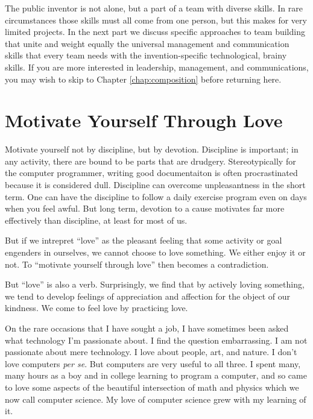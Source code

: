 \documentclass[
	fontsize=10pt, %
	twoside=false, %
	secnumdepth=1, %
]{kaobook}
\begin{document}

The public inventor is not alone, but a part of a team with diverse skills.
In rare circumstances those skills must all come from one person, but
this makes for very limited projects.
In the next part we discuss
specific approaches to team building that unite and weight
equally the universal management and communication skills that
every team needs with the invention-specific technological, brainy skills.
If you are more interested in leadership, management, and communications,
you may wish to skip to Chapter \ref{chap:composition} before returning here.

\section{Motivate Yourself Through Love}

Motivate yourself not by discipline, but by devotion.
Discipline is important; in any activity, there are bound to
be parts that are drudgery.
Stereotypically for the computer programmer, writing good
documentaiton is often procrastinated because it is considered
dull.
Discipline can overcome unpleasantness in the short term.
One can have the discipline to follow a daily exercise
program even on days when you feel awful.
But long term, devotion to a cause motivates
far more effectively than discipline, at
least for most of us.

But if we intrepret ``love'' as the pleasant feeling that
some activity or goal engenders in ourselves, we cannot
choose to love something. We either enjoy it or not.
To ``motivate yourself through love'' then becomes a contradiction.

But ``love'' is also a verb. Surprisingly, we find that
by actively loving something, we tend to develop feelings
of appreciation and affection for the object of our kindness.
We come to feel love by practicing love.

On the rare occasions that I have sought a job, I have sometimes
been asked what technology I'm passionate about.
I find the question embarrassing.
I am not passionate about mere technology.
I love about people, art, and nature.
I don't love computers {\em per se}.
But computers are very useful to all three.
I spent many, many hours as a boy and in college learning to program a computer,
and so came to love some aspects of the beautiful intersection of
math and physics which we now call computer science.
My love of computer science grew with my learning of it.
\end{document}

